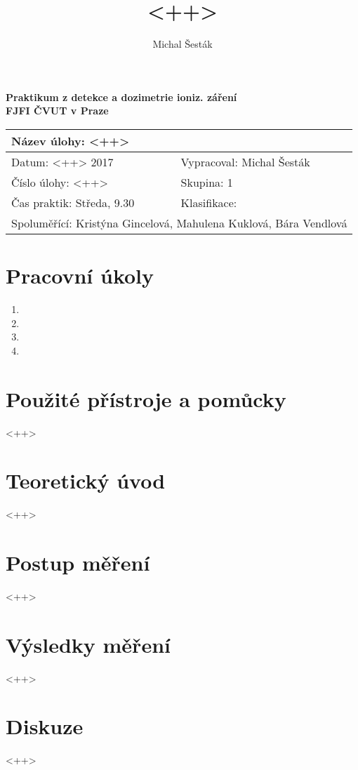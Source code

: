 \documentclass[11pt,a4paper]{article}
\author{Michal Šesták}
\title{<++>}
\begin{document}
\renewcommand{\figurename}{Obr.}
\renewcommand{\tablename}{Tab.}

\LARGE
\begin{center}
\textbf{Praktikum z detekce a dozimetrie ioniz. záření\\ FJFI ČVUT v Praze}
\end{center}\normalsize

\shorthandoff{-}
\begin{center}
\begin{tabular}{l l}
\multicolumn{2}{l}{Název úlohy: <++>}\\
\hline
Datum: <++> 2017 & Vypracoval: Michal Šesták \\
Číslo úlohy: <++> & Skupina: 1 \\
Čas praktik: Středa, 9.30 & Klasifikace:\\
\multicolumn{2}{l}{Spoluměřící: Kristýna Gincelová, Mahulena Kuklová, Bára Vendlová}\\
\end{tabular}
\end{center}
\shorthandon{-}

\section{Pracovní úkoly}
\begin{enumerate}
\item <++> 
\item <++> 
\item <++> 
\item <++> 
\end{enumerate}
\section{Použité přístroje a pomůcky}
<++>
\section{Teoretický úvod}
<++>
\section{Postup měření}
<++>
\section{Výsledky měření}
<++>
\section{Diskuze}
<++>
\end{document}
